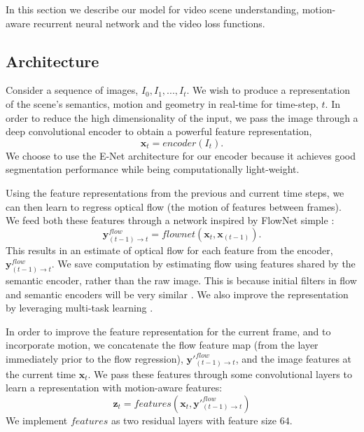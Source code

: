 In this section we describe our model for video scene understanding, motion-aware recurrent neural network and the video loss functions.

\subsection{Architecture}

Consider a sequence of images, $I_0, I_1, ... , I_t$. We wish to produce a representation of the scene's semantics, motion and geometry in real-time for time-step, $t$.
In order to reduce the high dimensionality of the input, we pass the image through a deep convolutional encoder to obtain a powerful feature representation,
\begin{equation}
\mathbf{x}_t = encoder(I_t).
\end{equation}
We choose to use the E-Net architecture for our encoder \citep{paszke2016enet} because it achieves good segmentation performance while being computationally light-weight.

Using the feature representations from the previous and current time steps, we can then learn to regress optical flow (the motion of features between frames). We feed both these features through a network inspired by FlowNet simple \citep{dosovitskiy2015flownet}:
\begin{equation}
\mathbf{y}^{flow}_{(t-1) \to t} = flownet(\mathbf{x}_t, \mathbf{x}_{(t-1)}).
\end{equation}
This results in an estimate of optical flow for each feature from the encoder, $\mathbf{y}^{flow}_{(t-1) \to t} $. We save computation by estimating flow using features shared by the semantic encoder, rather than the raw image. This is because initial filters in flow and semantic encoders will be very similar \citep{zeiler2014visualizing}. We also improve the representation by leveraging multi-task learning \citep{caruana1998multitask}.

In order to improve the feature representation for the current frame, and to incorporate motion, we concatenate the flow feature map (from the layer immediately prior to the flow regression), $\mathbf{y}'^{flow}_{(t-1) \to t}$, and the image features at the current time $\mathbf{x}_t$. We pass these features through some convolutional layers to learn a representation with motion-aware features:
\begin{equation}
\mathbf{z}_t = features(\mathbf{x}_t, \mathbf{y}'^{flow}_{(t-1) \to t})
\end{equation}
We implement $features$ as two residual layers \citep{he2016deep} with feature size $64$.


